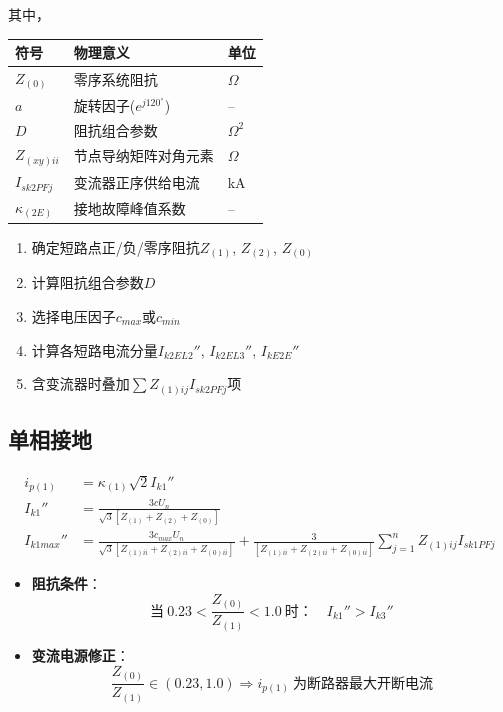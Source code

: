 \documentclass[a4paper,11pt,AutoFakeBold]{ctexart}
\begin{document}
其中，

\begin{tabular}{lll}
符号 & 物理意义 & 单位 \\
\hline
$Z_{(0)}$ & 零序系统阻抗 & $\Omega$ \\
$a$ & 旋转因子($e^{j120^\circ}$) & -- \\
$D$ & 阻抗组合参数 & $\Omega^2$ \\
$Z_{(xy)ii}$ & 节点导纳矩阵对角元素 & $\Omega$ \\
$I_{sk2PFj}$ & 变流器正序供给电流 & \si{kA} \\
$\kappa_{(2E)}$ & 接地故障峰值系数 & -- \\
\end{tabular}


\begin{enumerate}
\item 确定短路点正/负/零序阻抗$Z_{(1)}$, $Z_{(2)}$, $Z_{(0)}$
\item 计算阻抗组合参数$D$
\item 选择电压因子$c_{max}$或$c_{min}$
\item 计算各短路电流分量$I_{k2EL2}''$, $I_{k2EL3}''$, $I_{kE2E}''$
\item 含变流器时叠加$\sum Z_{(1)ij}I_{sk2PFj}$项
\end{enumerate}


\subsection{单相接地}

\begin{align}
i_{p(1)} &= \kappa_{(1)} \sqrt{2} I_{k1}'' \label{eq:peak1} \\
I_{k1}'' &= \frac{3cU_n}{\sqrt{3}[Z_{(1)} + Z_{(2)} + Z_{(0)}]} \label{eq:ik1} \\
I_{k1max}'' &= \frac{3c_{max}U_n}{\sqrt{3}[Z_{(1)ii} + Z_{(2)ii} + Z_{(0)ii}]} + \frac{3}{[Z_{(1)ii} + Z_{(2)ii} + Z_{(0)ii}]}\sum_{j=1}^{n}Z_{(1)ij}I_{sk1PFj} \label{eq:ik1max}
\end{align}


\begin{itemize}
\item \textbf{阻抗条件}：
  \[ \text{当}\ 0.23 < \frac{Z_{(0)}}{Z_{(1)}} < 1.0\ \text{时：} \quad I_{k1}'' > I_{k3}'' \]
  
\item \textbf{变流电源修正}：
  \[ \frac{Z_{(0)}}{Z_{(1)}} \in (0.23,1.0) \Rightarrow i_{p(1)}\ \text{为断路器最大开断电流} \]
\end{itemize}
\end{document}
